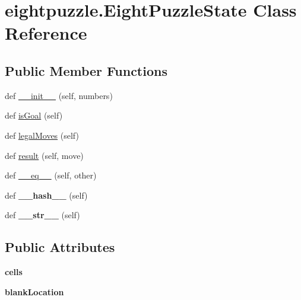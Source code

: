 \hypertarget{classeightpuzzle_1_1_eight_puzzle_state}{}\section{eightpuzzle.\+Eight\+Puzzle\+State Class Reference}
\label{classeightpuzzle_1_1_eight_puzzle_state}
\subsection*{Public Member Functions}
\begin{DoxyCompactItemize}
\item 
def \hyperlink{classeightpuzzle_1_1_eight_puzzle_state_a22373dfcbc8746448ef4eb2835694da4}{\+\_\+\+\_\+init\+\_\+\+\_\+} (self, numbers)
\item 
def \hyperlink{classeightpuzzle_1_1_eight_puzzle_state_a39205d164e781dcce7851fc757bf6299}{is\+Goal} (self)
\item 
def \hyperlink{classeightpuzzle_1_1_eight_puzzle_state_a84b1f014353df672abaa38767b775728}{legal\+Moves} (self)
\item 
def \hyperlink{classeightpuzzle_1_1_eight_puzzle_state_a00709c78e645608fffc3fd44d9941519}{result} (self, move)
\item 
def \hyperlink{classeightpuzzle_1_1_eight_puzzle_state_a1a6cd623a0dbba6f268db9a46e3e15e0}{\+\_\+\+\_\+eq\+\_\+\+\_\+} (self, other)
\item 
\mbox{\label{classeightpuzzle_1_1_eight_puzzle_state_af31f474616ddc6e1aab9272e0bd13a65}} 
def {\bfseries \+\_\+\+\_\+hash\+\_\+\+\_\+} (self)
\item 
\mbox{\label{classeightpuzzle_1_1_eight_puzzle_state_ab76b60f496605098988ef3267e93aae1}} 
def {\bfseries \+\_\+\+\_\+str\+\_\+\+\_\+} (self)
\end{DoxyCompactItemize}
\subsection*{Public Attributes}
\begin{DoxyCompactItemize}
\item 
\mbox{\label{classeightpuzzle_1_1_eight_puzzle_state_a3508c785ca25b87681f10b32baa6f53d}} 
{\bfseries cells}
\item 
\mbox{\label{classeightpuzzle_1_1_eight_puzzle_state_a515568111d27afb30819275eff1f2ccb}} 
{\bfseries blank\+Location}
\end{DoxyCompactItemize}


